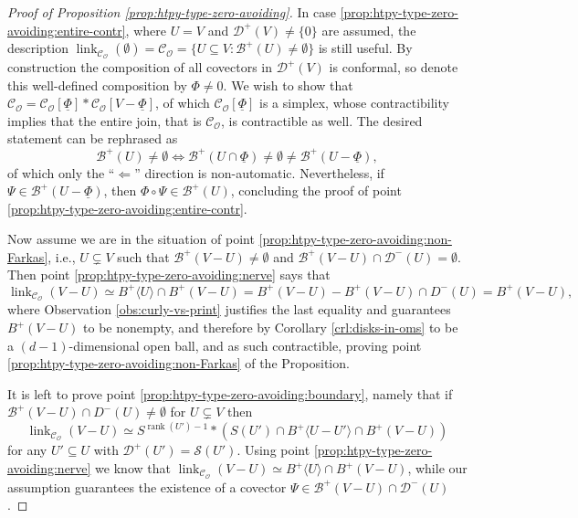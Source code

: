 \documentclass[a4paper,11pt,reqno, english]{amsart}
\theoremstyle{definition}
\theoremstyle{remark}
\DeclareMathOperator{\link}{\mathrm{link}}
\begin{document}
\begin{proof}[Proof of Proposition \ref{prop:htpy-type-zero-avoiding}]
    In case \ref{prop:htpy-type-zero-avoiding:entire-contr}, where $U=V$ and $\mathscr{D}^+(V)\neq\{0\}$ are assumed, the description $\link_{\mathscr{C}_\mathscr{O}}(\emptyset)=\mathscr{C}_\mathscr{O}=\{U\subseteq V:\mathscr{B}^+(U)\neq\emptyset\}$ is still useful. By construction the composition of all covectors in $\mathscr{D}^+(V)$ is conformal, so denote this well-defined composition by $\Phi\neq0$. We wish to show that $\mathscr{C}_\mathscr{O}=\mathscr{C}_\mathscr{O}[\underline{\Phi}]*\mathscr{C}_\mathscr{O}[V-\underline{\Phi}]$, of which $\mathscr{C}_\mathscr{O}[\underline{\Phi}]$ is a simplex, whose contractibility implies that the entire join, that is $\mathscr{C}_\mathscr{O}$, is contractible as well. The desired statement can be rephrased as 
    \[
    \mathscr{B}^+(U)\neq\emptyset\iff\mathscr{B}^+(U\cap\underline{\Phi})\neq\emptyset\neq\mathscr{B}^+(U-\underline{\Phi}),
    \] 
    of which only the ``$\Leftarrow$'' direction is non-automatic. Nevertheless, if $\Psi\in\mathscr{B}^+(U-\underline{\Phi})$, then $\Phi\circ\Psi\in\mathscr{B}^+(U)$, concluding the proof of point \ref{prop:htpy-type-zero-avoiding:entire-contr}.
    
    Now assume we are in the situation of point \ref{prop:htpy-type-zero-avoiding:non-Farkas}, i.e., $U\subsetneq V$ such that $\mathscr{B}^+(V-U)\neq\emptyset$ and $\mathscr{B}^+(V-U)\cap\mathscr{D}^-(U)=\emptyset$. Then point \ref{prop:htpy-type-zero-avoiding:nerve} says that 
    \[
    \link_{\mathscr{C}_\mathscr{O}}(V-U)\simeq B^+\langle U\rangle\cap B^+(V-U)=B^+(V-U)-B^+(V-U)\cap D^-(U)=B^+(V-U), 
    \]
    where Observation \ref{obs:curly-vs-print} justifies the last equality and guarantees $B^+(V-U)$ to be nonempty, and therefore by Corollary \ref{crl:disks-in-oms} to be a $(d-1)$-dimensional open ball, and as such contractible, proving point \ref{prop:htpy-type-zero-avoiding:non-Farkas} of the Proposition.
    
    It is left to prove point \ref{prop:htpy-type-zero-avoiding:boundary}, namely that if $\mathscr{B}^+(V-U)\cap D^-(U)\neq\emptyset$ for $U\subsetneq V$ then 
    \[
    \link_{\mathscr{C}_\mathscr{O}}(V-U)\simeq S^{\operatorname{rank}(U')-1}*(S(U')\cap B^+\langle U-U'\rangle\cap B^+(V-U))
    \] 
    for any $U'\subseteq U$ with $\mathscr{D}^+(U')=\mathscr{S}(U')$.
    Using point \ref{prop:htpy-type-zero-avoiding:nerve} we know that $\link_{\mathscr{C}_\mathscr{O}}(V-U)\simeq B^+\langle U\rangle\cap B^+(V-U)$, while our assumption guarantees the existence of a covector $\Psi\in \mathscr{B}^+(V-U)\cap \mathscr{D}^-(U)$.


\end{proof}
\end{document}
